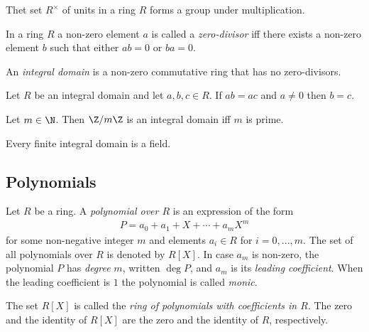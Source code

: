 \documentclass{article}
\begin{document}
\begin{proposition}
	Thet set $R^\times$ of units in a ring $R$ forms a group under multiplication.
\end{proposition}

\begin{definition}
	In a ring $R$ a non-zero element $a$ is called a \emph{zero-divisor} iff
	there exists a non-zero element $b$ such that either $ab=0$ or $ba=0$.
\end{definition}

\begin{definition}
	An \emph{integral domain} is a non-zero commutative ring that has no zero-divisors.
\end{definition}

\begin{proposition}[Notes 3.2.15]
	Let $R$ be an integral domain and let $a,b,c\in R$. If $ab=ac$ and $a\not=0$
	then $b=c$.
\end{proposition}

\begin{proposition}[Notes 3.2.16]
	Let $m\in\N$. Then $\Z/m\Z$ is an integral domain iff $m$ is prime.
\end{proposition}

\begin{theorem}[Notes 3.2.17]
	Every finite integral domain is a field.
\end{theorem}

\subsection{Polynomials}

\begin{definition}
	Let $R$ be a ring. A \emph{polynomial over $R$} is an expression of the form
	\begin{align*}
		P=a_0+a_1+X+\cdots+a_mX^m
	\end{align*}
	for some non-negative integer $m$ and elements $a_i\in R$ for $i=0,...,m$.
	The set of all polynomials over $R$ is denoted by $R[X]$. In case $a_m$
	is non-zero, the polynomial $P$ has \emph{degree} $m$, written $\deg P$,
	and $a_m$ is its \emph{leading coefficient}. When the leading coefficient is
	$1$ the polynomial is called \emph{monic}.
\end{definition}

\begin{definition}
	The set $R[X]$ is called the \emph{ring of polynomials with coefficients
		in $R$}. The zero and the identity of $R[X]$ are the zero and the identity of
	$R$, respectively.
\end{definition}
\end{document}
